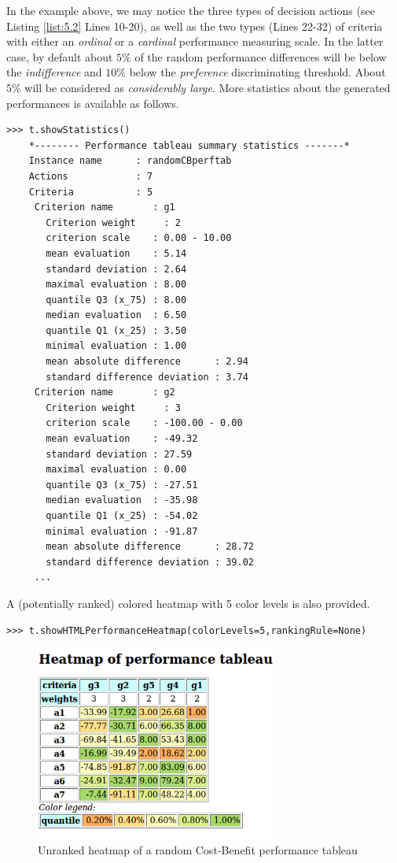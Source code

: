 In the example above, we may notice the three types of decision actions (see Listing \ref{list:5.2} Lines 10-20), as well as the two types (Lines 22-32) of criteria with either an \emph{ordinal} or a \emph{cardinal} performance measuring scale. In the latter case, by default about $5\%$ of the random performance differences will be below the \emph{indifference} and $10\%$ below the \emph{preference} discriminating threshold. About $5\%$ will be considered as \emph{considerably large}. More statistics about the generated performances is available as follows.
\begin{lstlisting}
>>> t.showStatistics()
    *-------- Performance tableau summary statistics -------*
    Instance name      : randomCBperftab
    Actions            : 7
    Criteria           : 5
     Criterion name       : g1
       Criterion weight     : 2
       criterion scale    : 0.00 - 10.00
       mean evaluation    : 5.14
       standard deviation : 2.64
       maximal evaluation : 8.00
       quantile Q3 (x_75) : 8.00
       median evaluation  : 6.50
       quantile Q1 (x_25) : 3.50
       minimal evaluation : 1.00
       mean absolute difference      : 2.94
       standard difference deviation : 3.74
     Criterion name       : g2
       Criterion weight     : 3
       criterion scale    : -100.00 - 0.00
       mean evaluation    : -49.32
       standard deviation : 27.59
       maximal evaluation : 0.00
       quantile Q3 (x_75) : -27.51
       median evaluation  : -35.98
       quantile Q1 (x_25) : -54.02
       minimal evaluation : -91.87
       mean absolute difference      : 28.72
       standard difference deviation : 39.02
     ...
\end{lstlisting}

A (potentially ranked) colored heatmap with 5 color levels is also provided.
\begin{lstlisting}[basicstyle=\footnotesize]
   >>> t.showHTMLPerformanceHeatmap(colorLevels=5,rankingRule=None)
 \end{lstlisting}

 \begin{figure}[h]
\includegraphics[width=8cm]{Figures/randomCBHeatmap.png}
\caption{Unranked heatmap of a random Cost-Benefit performance tableau}
\label{fig:5.2}       %
\end{figure}
 
